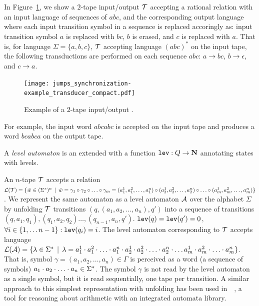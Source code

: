 \begin{example}\label{example:2_tape_nft}
In Figure~\ref{fig:2_tape_nft}, we show a $2$-tape input/output \nft $\mathcal{T}$ accepting a rational relation with an input language of sequences of $abc$, and the corresponding output language where each input transition symbol in a sequence is replaced accoringly as: input transition symbol $a$ is replaced with $bc$, $b$ is erased, and $c$ is replaced with $a$.
That is, for language $\Sigma = \{ a, b, c \}$, $\mathcal{T}$ accepting language $(abc)^*$ on the input tape, the following transductions are performed on each sequence $abc$:
$a \rightarrow bc$,
$b \rightarrow \epsilon$, and
$c \rightarrow a$.

\begin{figure}[!ht]
  \centering
    \texttt{[image: jumps\_synchronization-example\_transducer\_compact.pdf]}
  \caption{
    Example of a 2-tape input/output \nft.
  }\label{fig:2_tape_nft}
\end{figure}

For example, the input word $abcabc$ is accepted on the input tape and produces a word $bcabca$ on the output tape.

\end{example}

A \emph{level automaton} is an \nfa extended with a function $\texttt{lev}: Q \rightarrow \mathbf{N}$ annotating states with levels.

An $n$-tape \nft $\mathcal{T}$ accepts a relation $\mathcal{L}(\mathcal{T}) = \{ \bar{{w}} \in (\Sigma^*)^n \,\mid\, \bar{{w}} = \gamma_1 \circ \gamma_2 \circ \ldots \circ \gamma_m = (a^1_1, a^2_1, \ldots, a^n_1) \circ (a^1_2, a^2_2, \ldots, a^n_2) \circ \ldots \circ (a^1_m, a^2_m, \ldots, a^n_m) \}$.
We represent the same automaton as a level automaton $\mathcal{A}$ over the alphabet $\Sigma$ by unfolding $\mathcal{T}$ transitions $(q, (a_1, a_2, \ldots, a_n), q')$ into a sequence of \nfa transitions $(q, a_1, q_1), (q_1, a_2, q_2) \ldots, (q_{n - 1}, a_n, q')$.
$\texttt{lev}(q) = \texttt{lev}(q') = 0$, $\forall i \in \{ 1, \ldots n - 1  \}: \texttt{lev}(q_i) = i$.
The level automaton corresponding to $\mathcal{T}$ accepts language $\mathcal{L}(\mathcal{A}) = \{ \lambda \in \Sigma^* \,\mid\, \lambda = a^1_1 \cdot a^2_1 \cdot \ldots \cdot a^n_1 \cdot a^1_2 \cdot a^2_2 \cdot \ldots \cdot a^n_2 \cdot \ldots a^1_m \cdot a^2_m \cdot \ldots \cdot a^n_m \}$.
That is, \nft symbol $\gamma = (a_1, a_2, \ldots, a_n) \in \Gamma$ is perceived as a word (a sequence of symbols) $a_1 \cdot a_2\cdot \ldots \cdot a_n \in \Sigma^*$.
The symbol $\gamma$ is not read by the level automaton as a single symbol, but it is read sequentially, one tape per transition.
A similar approach to this simplest representation with unfolding has been used in~\lash~\cite{10.1007/3-540-46419-0_1}, a tool for reasoning about arithmetic with an integrated automata library.

